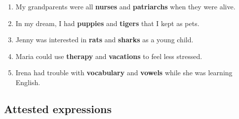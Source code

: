 \documentclass[authoryear]{elsarticle}
\begin{document}
\begin{enumerate}
\item My grandparents were all \textbf{nurses} and \textbf{patriarchs} when they were alive.
\item In my dream, I had \textbf{puppies} and \textbf{tigers} that I kept as pets.
\item Jenny was interested in \textbf{rats} and \textbf{sharks} as a young child.
\item Maria could use \textbf{therapy} and \textbf{vacations} to feel less stressed.
\item Irena had trouble with \textbf{vocabulary} and \textbf{vowels} while she was learning English.
\end{enumerate}

\subsection{Attested expressions}
\end{document}
